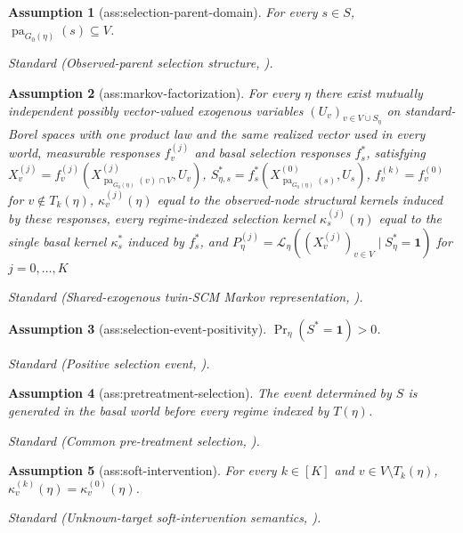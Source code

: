 \documentclass{article}
\newtheorem{assumption}{Assumption}
\begin{document}
\begin{assumption}[ass:selection-parent-domain]\label{ass:selection-parent-domain}
For every \(s\in S\), \(\operatorname{pa}_{G_0(\eta)}(s)\subseteq V\).
\par\smallskip\noindent\emph{Standard} (Observed-parent selection structure, \cite{DaiEtAl2025SelectionIntervention}).
\end{assumption}

\begin{assumption}[ass:markov-factorization]\label{ass:markov-factorization}
For every \(\eta\) there exist mutually independent possibly vector-valued exogenous variables \((U_v)_{v\in V\mathbin{\dot\cup}S_\eta}\) on standard-Borel spaces with one product law and the same realized vector used in every world, measurable responses \(f_v^{(j)}\) and basal selection responses \(f_s^*\), satisfying \(X_v^{(j)}=f_v^{(j)}(X_{\operatorname{pa}_{G_0(\eta)}(v)\cap V}^{(j)},U_v)\), \(S_{\eta,s}^*=f_s^*(X_{\operatorname{pa}_{G_0(\eta)}(s)}^{(0)},U_s)\), \(f_v^{(k)}=f_v^{(0)}\) for \(v\notin T_k(\eta)\), \(\kappa_v^{(j)}(\eta)\) equal to the observed-node structural kernels induced by these responses, every regime-indexed selection kernel \(\kappa_s^{(j)}(\eta)\) equal to the single basal kernel \(\kappa_s^*\) induced by \(f_s^*\), and \(P_\eta^{(j)}=\mathcal L_\eta((X_v^{(j)})_{v\in V}\mid S_\eta^*=\mathbf1)\) for \(j=0,\ldots,K\)
\par\smallskip\noindent\emph{Standard} (Shared-exogenous twin-SCM Markov representation, \cite{DaiEtAl2025SelectionIntervention}).
\end{assumption}

\begin{assumption}[ass:selection-event-positivity]\label{ass:selection-event-positivity}
\(\Pr_{\eta}(S^*=\mathbf 1)>0\).
\par\smallskip\noindent\emph{Standard} (Positive selection event, \cite{DaiEtAl2025SelectionIntervention}).
\end{assumption}

\begin{assumption}[ass:pretreatment-selection]\label{ass:pretreatment-selection}
The event determined by \(S\) is generated in the basal world before every regime indexed by \(T(\eta)\).
\par\smallskip\noindent\emph{Standard} (Common pre-treatment selection, \cite{DaiEtAl2025SelectionIntervention}).
\end{assumption}

\begin{assumption}[ass:soft-intervention]\label{ass:soft-intervention}
For every \(k\in[K]\) and \(v\in V\setminus T_k(\eta)\), \(\kappa_v^{(k)}(\eta)=\kappa_v^{(0)}(\eta)\).
\par\smallskip\noindent\emph{Standard} (Unknown-target soft-intervention semantics, \cite{DaiEtAl2025SelectionIntervention}).
\end{assumption}
\end{document}
